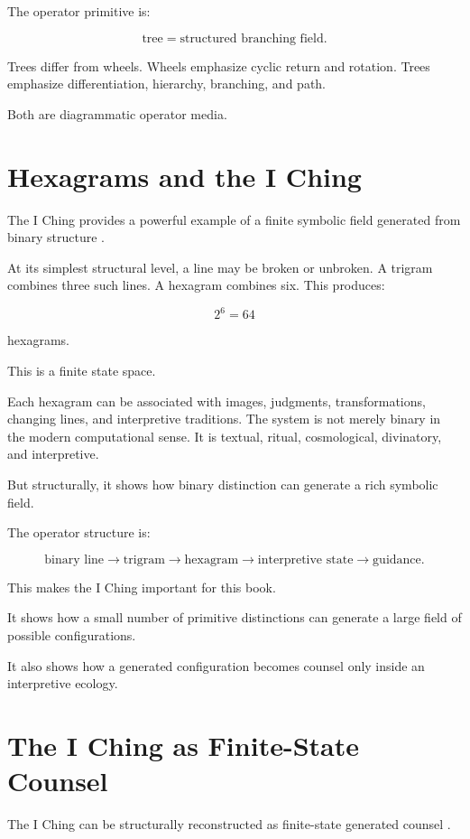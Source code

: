 \documentclass[11pt]{book}
\begin{document}
The operator primitive is:

\[
\text{tree} = \text{structured branching field}.
\]

Trees differ from wheels. Wheels emphasize cyclic return and rotation. Trees emphasize differentiation, hierarchy, branching, and path.

Both are diagrammatic operator media.

\section{Hexagrams and the I Ching}

The I Ching provides a powerful example of a finite symbolic field generated from binary structure \cite{WilhelmBaynes1967IChing,Shaughnessy1996IChing,Loewe1994DivinationMythologyMonarchy}.

At its simplest structural level, a line may be broken or unbroken. A trigram combines three such lines. A hexagram combines six. This produces:

\[
2^6 = 64
\]

hexagrams.

This is a finite state space.

Each hexagram can be associated with images, judgments, transformations, changing lines, and interpretive traditions. The system is not merely binary in the modern computational sense. It is textual, ritual, cosmological, divinatory, and interpretive.

But structurally, it shows how binary distinction can generate a rich symbolic field.

The operator structure is:

\[
\text{binary line}
\rightarrow
\text{trigram}
\rightarrow
\text{hexagram}
\rightarrow
\text{interpretive state}
\rightarrow
\text{guidance}.
\]

This makes the I Ching important for this book.

It shows how a small number of primitive distinctions can generate a large field of possible configurations.

It also shows how a generated configuration becomes counsel only inside an interpretive ecology.

\section{The I Ching as Finite-State Counsel}

The I Ching can be structurally reconstructed as finite-state generated counsel \cite{WilhelmBaynes1967IChing,Shaughnessy1996IChing}.
\end{document}
